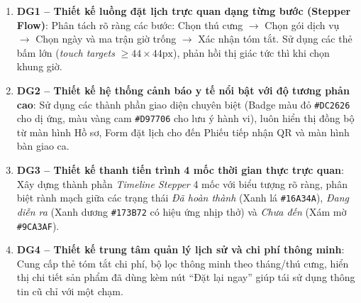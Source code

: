 \begin{enumerate}
    \item \textbf{DG1 -- Thiết kế luồng đặt lịch trực quan dạng từng bước (Stepper Flow)}: Phân tách rõ ràng các bước: Chọn thú cưng $\rightarrow$ Chọn gói dịch vụ $\rightarrow$ Chọn ngày và ma trận giờ trống $\rightarrow$ Xác nhận tóm tắt. Sử dụng các thẻ bấm lớn (\textit{touch targets} $\ge 44 \times 44\text{px}$), phản hồi thị giác tức thì khi chọn khung giờ.
    \item \textbf{DG2 -- Thiết kế hệ thống cảnh báo y tế nổi bật với độ tương phản cao}: Sử dụng các thành phần giao diện chuyên biệt (Badge màu đỏ \texttt{\#DC2626} cho dị ứng, màu vàng cam \texttt{\#D97706} cho lưu ý hành vi), luôn hiển thị đồng bộ từ màn hình Hồ sơ, Form đặt lịch cho đến Phiếu tiếp nhận QR và màn hình bàn giao ca.
    \item \textbf{DG3 -- Thiết kế thanh tiến trình 4 mốc thời gian thực trực quan}: Xây dựng thành phần \textit{Timeline Stepper} 4 mốc với biểu tượng rõ ràng, phân biệt rành mạch giữa các trạng thái \textit{Đã hoàn thành} (Xanh lá \texttt{\#16A34A}), \textit{Đang diễn ra} (Xanh dương \texttt{\#173B72} có hiệu ứng nhịp thở) và \textit{Chưa đến} (Xám mờ \texttt{\#9CA3AF}).
    \item \textbf{DG4 -- Thiết kế trung tâm quản lý lịch sử và chi phí thông minh}: Cung cấp thẻ tóm tắt chi phí, bộ lọc thông minh theo tháng/thú cưng, hiển thị chi tiết sản phẩm đã dùng kèm nút ``Đặt lại ngay'' giúp tái sử dụng thông tin cũ chỉ với một chạm.
\end{enumerate}
